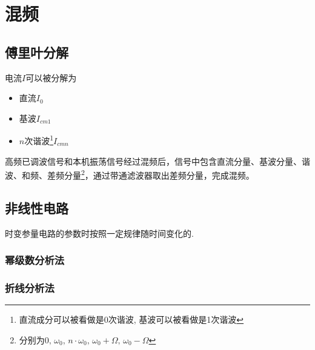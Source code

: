 \documentclass[a4paper]{report}
\begin{document}
\chapter{混频}
\section{傅里叶分解}
电流$I$可以被分解为
\begin{itemize}
  \item 直流$I_0$
  \item 基波$I_{cm1}$
  \item $n$次谐波\footnote{直流成分可以被看做是0次谐波, 基波可以被看做是1次谐波}$I_{cmn}$
\end{itemize}
高频已调波信号和本机振荡信号经过混频后，信号中包含直流分量、基波分量、谐波、和频、差频分量\footnote{分别为$0,\,\omega_0,\,n\cdot\omega_0,\,\omega_0+\Omega,\,\omega_0-\Omega$}，通过带通滤波器取出差频分量，完成混频。
\section{非线性电路}
时变参量电路的参数时按照一定规律随时间变化的. 
\subsection{幂级数分析法}
\subsection{折线分析法}
\end{document}
